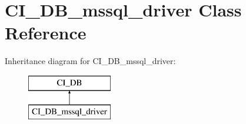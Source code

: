 \hypertarget{class_c_i___d_b__mssql__driver}{\section{C\-I\-\_\-\-D\-B\-\_\-mssql\-\_\-driver Class Reference}
\label{class_c_i___d_b__mssql__driver}
}
Inheritance diagram for C\-I\-\_\-\-D\-B\-\_\-mssql\-\_\-driver\-:\begin{figure}[H]
\begin{center}
\leavevmode
\includegraphics[height=2.000000cm]{class_c_i___d_b__mssql__driver}
\end{center}
\end{figure}

